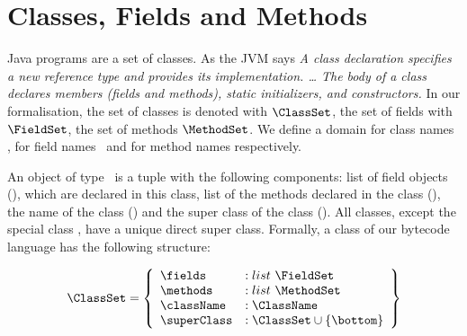 
 \section{Classes, Fields and Methods}\label{clazz}
 Java programs are a set of classes. As the JVM says \textit{ A class declaration specifies a new reference type and provides its implementation. \ldots
 The body of a class declares members (fields and methods), static initializers, and constructors. }
 In our formalisation, the set of classes is denoted with $\ClassSet$, the set of fields with $\FieldSet$, the set of methods $\MethodSet$.
 We define a domain for class names \ClassName, for field names \FieldName \ and for method names \MethodName respectively.

 An object of type \ClassSet \ is a tuple with the following components: list of field objects (\fields), which are declared in this class,
 list of the methods declared in the class (\methods), the name of the class (\className)   and the super class of the class (\superClass).
 All classes, except the special class \Object, have a unique direct super class. Formally, a class of our bytecode language 
 has the following structure:


 $$ \begin{array}{l}
         \ClassSet = \left\{\begin{array}{ll} \fields    & :    list \ \FieldSet \\
                                          \methods    & :    list \ \MethodSet\\
					  \className  & :   \ClassName \\
					  \superClass & :   \ClassSet \cup \{ \bottom \}
                    \end{array} \right\}
   \end{array} $$

